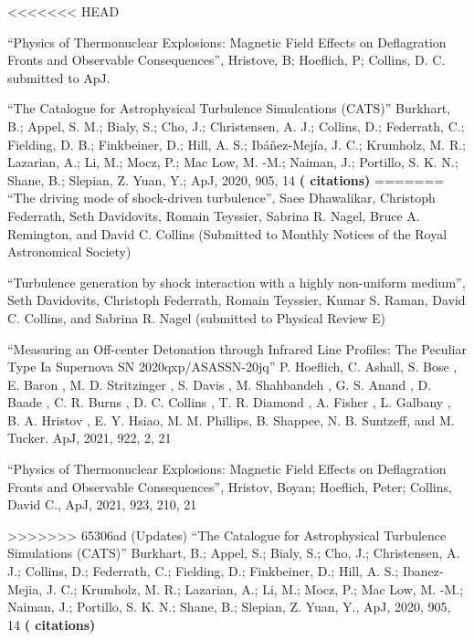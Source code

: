 \newcommand{\citeform}[1]{{\bf (#1 citations)}}

\medskip
\noindent
<<<<<<< HEAD

``Physics of Thermonuclear Explosions: Magnetic Field Effects on Deflagration Fronts and Observable Consequences'', Hristove, B; Hoeflich, P; Collins, D. C. submitted to ApJ.

\medskip
\noindent
``The Catalogue for Astrophysical Turbulence Simulcations (CATS)'' Burkhart, B.; Appel, S. M.; Bialy, S.; Cho, J.; Christensen, A. J.; Collins, D.; Federrath, C.; Fielding, D. B.; Finkbeiner, D.; Hill, A. S.; Ibáñez-Mejía, J. C.; Krumholz, M. R.; Lazarian, A.; Li, M.; Mocz, P.; Mac Low, M. -M.; Naiman, J.; Portillo, S. K. N.; Shane, B.; Slepian, Z. Yuan, Y.;  ApJ, 2020, 905, 14
\citeform{}%
=======
``The driving mode of shock-driven turbulence'',
Saee Dhawalikar, Christoph Federrath, Seth Davidovits, Romain
Teyssier, Sabrina R. Nagel, Bruce A. Remington, and David C. Collins
(Submitted to Monthly Notices of the Royal Astronomical Society)

\medskip
\noindent
``Turbulence generation by shock interaction with a highly non-uniform
medium'', Seth Davidovits, Christoph Federrath, Romain Teyssier,
Kumar S. Raman, David C. Collins, and Sabrina R. Nagel  (submitted to Physical
Review E)

\medskip
\noindent
``Measuring an Off-center Detonation through Infrared Line Profiles: The
Peculiar Type Ia Supernova SN 2020qxp/ASASSN-20jq'' P. Hoeflich, C. Ashall,
S. Bose , E. Baron , M. D. Stritzinger , S. Davis , M. Shahbandeh , G. S.
Anand ,
D. Baade , C. R. Burns , D. C. Collins , T. R. Diamond , A. Fisher , L.
Galbany , B. A. Hristov ,
E. Y. Hsiao, M. M. Phillips, B. Shappee, N. B. Suntzeff, and M.
Tucker.  ApJ, 2021, 922, 2, 21

\medskip
\noindent
``Physics of Thermonuclear Explosions: Magnetic Field Effects on Deflagration
Fronts and Observable Consequences'', Hristov, Boyan; Hoeflich, Peter; Collins,
David C., ApJ, 2021, 923, 210, 21

\noindent
>>>>>>> 65306ad (Updates)
``The Catalogue for Astrophysical Turbulence Simulations (CATS)'' Burkhart, B.;
Appel, S.; Bialy, S.; Cho, J.; Christensen, A. J.; Collins, D.; Federrath, C.;
Fielding, D.; Finkbeiner, D.; Hill, A. S.; Ibanez-Mejia, J. C.; Krumholz, M. R.;
Lazarian, A.; Li, M.; Mocz, P.; Mac Low, M. -M.; Naiman, J.; Portillo, S. K. N.;
Shane, B.; Slepian, Z. Yuan, Y., ApJ, 2020, 905, 14
\citeform{}



